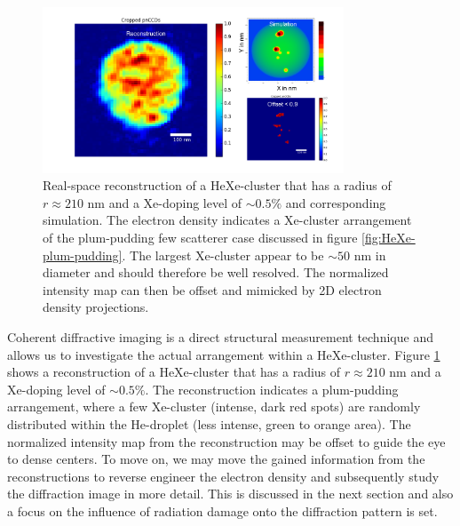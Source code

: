 \begin{figure}
 	\centering
 		\includegraphics[width=0.80\textwidth]{images/results/reconstructions-to-simulations.png}
 	\caption[Reconstruction of HeXe-cluster and simulated electron densities.]{Real-space reconstruction of a HeXe-cluster that has a radius of $r\approx 210$ nm and a Xe-doping level of $\sim 0.5\%$ and corresponding simulation. The electron density indicates a Xe-cluster arrangement of the plum-pudding few scatterer case discussed in figure \ref{fig:HeXe-plum-pudding}. The largest Xe-cluster appear to be $\sim 50$ nm in diameter and should therefore be well resolved. The normalized intensity map can then be offset and mimicked by 2D electron density projections.}
 	\label{fig:HeXe-cluster-60}
\end{figure}
Coherent diffractive imaging is a direct structural measurement technique and allows us to investigate the actual arrangement within a HeXe-cluster. Figure \ref{fig:HeXe-cluster-60} shows a reconstruction of a HeXe-cluster that has a radius of $r\approx 210$ nm and a Xe-doping level of $\sim 0.5 \%$. The reconstruction indicates a plum-pudding arrangement, where a few Xe-cluster (intense, dark red spots) are randomly distributed within the He-droplet (less intense, green to orange area). The normalized intensity map from the reconstruction may be offset to guide the eye to dense centers. To move on, we may move the gained information from the reconstructions to reverse engineer the electron density and subsequently study the diffraction image in more detail. This is discussed in the next section and also a focus on the influence of radiation damage onto the diffraction pattern is set.
%
%
%
%
%
%
